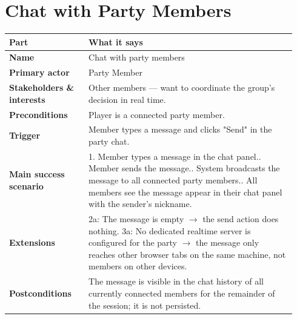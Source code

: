\documentclass[11pt,twocolumn]{article}
\newcommand{\ucheader}{%
\textbf{Part} & \textbf{What it says} \\
\hline
\endhead
\hline
\endfoot
}
\begin{document}
\section{Chat with Party Members}
{\footnotesize
\begin{longtable}{@{}p{0.26\linewidth}p{0.68\linewidth}@{}}
\hline
\ucheader
\textbf{Name} & Chat with party members \\
\hline
\textbf{Primary actor} & Party Member \\
\hline
\textbf{Stakeholders \& interests} & Other members --- want to coordinate the group's decision in real time. \\
\hline
\textbf{Preconditions} & Player is a connected party member. \\
\hline
\textbf{Trigger} & Member types a message and clicks "Send" in the party chat. \\
\hline
\textbf{Main success scenario} & 1. Member types a message in the chat panel.\newline
2. Member sends the message.\newline
3. System broadcasts the message to all connected party members.\newline
4. All members see the message appear in their chat panel with the sender's nickname. \\
\hline
\textbf{Extensions} & 2a: The message is empty $\rightarrow$ the send action does nothing.\newline
3a: No dedicated realtime server is configured for the party $\rightarrow$ the message only reaches other browser tabs on the same machine, not members on other devices. \\
\hline
\textbf{Postconditions} & The message is visible in the chat history of all currently connected members for the remainder of the session; it is not persisted. \\
\hline
\end{longtable}
}
\end{document}
